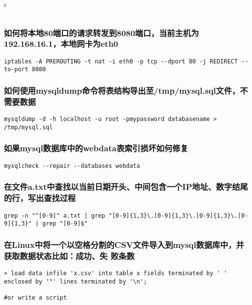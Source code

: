 \documentclass{article}
\begin{document}
\begin{mitned}{c}
\begin{verbatim}
\end{verbatim}

\subsubsection{如何将本地80端口的请求转发到8080端口，当前主机为192.168.16.1，本地网卡为eth0}
\begin{verbatim}
iptables -A PREROUTING -t nat -i eth0 -p tcp --dport 80 -j REDIRECT --to-port 8080
\end{verbatim}

\subsubsection{如何使用mysqldump命令将表结构导出至/tmp/mysql.sql文件，不需要数据}
\begin{verbatim}
mysqldump -d -h localhost -u root -pmypassword databasename > /tmp/mysql.sql
\end{verbatim}

\subsubsection{如果mysql数据库中的webdata表索引损坏如何修复}
\begin{verbatim}
mysqlcheck --repair --databases webdata
\end{verbatim}

\subsubsection{在文件a.txt中查找以当前日期开头、中间包含一个IP地址、数字结尾的行，写出查找过程}

\begin{verbatim}
grep -n "^[0-9]" a.txt | grep "[0-9]{1,3}\.[0-9]{1,3}\.[0-9]{1,3}\.[0-9]{1,3}" | grep "[0-9]$"

\end{verbatim}

\subsubsection{在Linux中将一个以空格分割的CSV文件导入到mysql数据库中，并获取数据状态比如：成功、失
败条数}
\begin{verbatim}
> load data infile 'x.csv' into table x fields terminated by ' ' 
enclosed by '"' lines terminated by '\n';

#or write a script
\end{verbatim}


\end{mitned}
\end{document}
